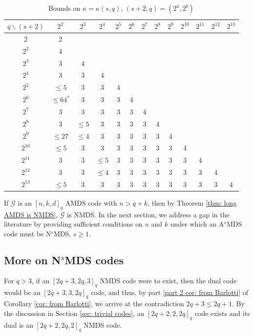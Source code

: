 \documentclass[11pt,a4paper]{amsart}
\newcommand{\G}{\mathcal{G}}
\theoremstyle{plain}
\theoremstyle{definition}
\theoremstyle{remark}
\begin{document}
	\begin{table}[ht]
		\centering
		\caption{Bounds on  $\kappa = \kappa (s,q)$, $(s+2,q)=(2^a,2^b)$} \label{table: small kappa values}
		\begin{tabular}{|c||*{12}{c|}}
			\hline
			$q \backslash (s+2)$  & $2^{2}$ & $2^{3}$ & $2^{4}$ & $2^{5}$ & $2^{6}$ & $2^{7}$ & $2^{8}$ & $2^{9}$ & $2^{10}$ & $2^{11}$  & $2^{12}$ &$2^{13}$ \\
			\hline\hline
			$2$  &2 &  & & & & &  & & & && \\ \hline
			$2^2$  &4 &  & & & & &  & & & &&  \\
			\hline
			$2^3$  &3 & 4 & & & & &  & & & && \\
			\hline
			$2^4$ & 3& 3 &  4 & & & &  & && & & \\
			\hline
			$2^5$ & $\le 5$& 3 & 3 &  4 & & & & & & &&  \\
			\hline
			$2^6$ &$\le 64^*$ &3 &3 &3 &  4 & &  && & &&  \\
			\hline
			$2^7$ & 3& 3& 3& 3&3 &  4 &  & & & && \\
			\hline
			$2^8$ & 3& $\le 5$& 3& 3& 3&3 &  4 & &  & & &\\
			\hline
			$2^9$ & $\le 27$  & $\le 4$ & 3& 3& 3& 3& 3 &  4 && &  &\\
			\hline
			$2^{10}$ & $\le 5$ & 3&3 &3 & 3& 3& 3 &3 &  4 & & &\\
			\hline
			$2^{11}$ & 3 & 3&$\le 5$ &3 & 3& 3& 3 &3 &  3 & 4 & &\\
			\hline
			$2^{12}$ & 3 & 3& $\le 4$ & 3 & 3& 3& 3 &3 &  3 & 3 & 4&\\ %
			\hline
			$2^{13}$ & $\le 5$ & 3& 3 & 3 & 3& 3& 3 &3 &  3 & 3 & 3& 4\\ %
			\hline
		\end{tabular}
	\end{table}

	If $\G$ is an $[n,k,d]_q$ AMDS code with $n>q+k$, then by Theorem \ref{thm: long AMDS is NMDS}, $\G$ is NMDS. In the next section, we address a gap in the literature by providing sufficient conditions on $n$ and $k$ under which an A$^s$MDS code must be N$^s$MDS, $s\ge 1$.

	\subsection{More on N$^s$MDS codes}

	For $q>3$, if an $[2q+3,2q,3]_q$ NMDS code were to exist, then the dual code would be an $[2q+3,3,2q]_q$ code, and thus, by part \ref{part 2 cor: from Barlotti} of Corollary \ref{cor: from Barlotti}, we arrive at the contradiction $2q+3\le 2q+1$.  By the discussion in Section \ref{sec: trivial codes}, an $[2q+2,2,2q]_q$ code exists and its dual is an $[2q+2,2q,2]_q$ NMDS code.
\end{document}
